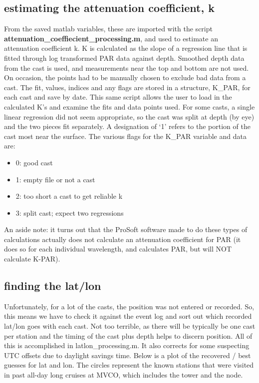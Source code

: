 \documentclass[11pt]{article}
\begin{document}
\subsection{estimating the attenuation coefficient, k}

From the saved matlab variables, these are imported with the script \textbf{attenuation\_coeffiecient\_processing.m}, and used to estimate an attenuation coefficient k. K is calculated as the slope of a regression line that is fitted through log transformed PAR data against depth. Smoothed depth data from the cast is used, and measurements near the top and bottom are not used. On occasion, the points had to be manually chosen to exclude bad data from a cast. The fit, values, indices and any flags are stored in a structure, K\_PAR, for each cast and save by date. This same script allows the user to load in the calculated K's and examine the fits and data points used. For some casts, a single linear regression did not seem appropriate, so the cast was split at depth (by eye) and the two pieces fit separately. A designation of `1' refers to the portion of the cast most near the surface. The various flags for the K\_PAR variable and data are:

\begin{itemize}
\item 0: good cast
\item 1: empty file or not a cast
\item 2: too short a cast to get reliable k
\item 3: split cast; expect two regressions
\end{itemize}

\noindent An aside note: it turns out that the ProSoft software made to do these types of calculations actually does not calculate an attenuation coefficient for PAR (it does so for each individual wavelength, and calculates PAR, but will NOT calculate K-PAR). 

\subsection{finding the lat/lon}

Unfortunately, for a lot of the casts, the position was not entered or recorded. So, this means we have to check it against the event log and sort out which recorded lat/lon goes with each cast. Not too terrible, as there will be typically be one cast per station and the timing of the cast plus depth helps to discern position. All of this is accomplished in latlon\_processing.m. It also corrects for some suspecting UTC offsets due to daylight savings time.
Below is a plot of the recovered / best guesses for lat and lon. The circles represent the known stations that were visited in past all-day long cruises at MVCO, which includes the tower and the node.
\end{document}
